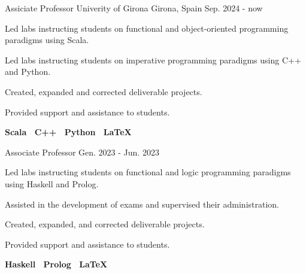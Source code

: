 

\begin{cventries}

  \cventry
    {Assiciate Professor}
    {Univerity of Girona}
    {Girona, Spain}
    {Sep. 2024 - now}
    {
    \begin{cvitems}
    \item {Led labs instructing students on functional and object-oriented programming paradigms using Scala.}
    \item {Led labs instructing students on imperative programming paradigms using C++ and Python.}
    \item{Created, expanded and corrected deliverable projects.}
    \item{Provided support and assistance to students.}
    \item {
      \textbf{
        Scala \textbar \
        C++ \textbar \
        Python \textbar \
        \LaTeX
      }
    }
    \end{cvitems}
  }
  \cventry
    {Associate Professor}
    {} %
    {} %
    {Gen. 2023 - Jun. 2023} %
    {
    \begin{cvitems}
    \item {Led labs instructing students on functional and logic programming paradigms using Haskell and Prolog.}
    \item{Assisted in the development of exams and supervised their administration.}
    \item{Created, expanded, and corrected deliverable projects.}
    \item{Provided support and assistance to students.}
    \item {
      \textbf{
        Haskell \textbar \
        Prolog \textbar \
        \LaTeX
      }
    }
    \end{cvitems}
    \vspace{0.25cm}
 	  }



\end{cventries}
